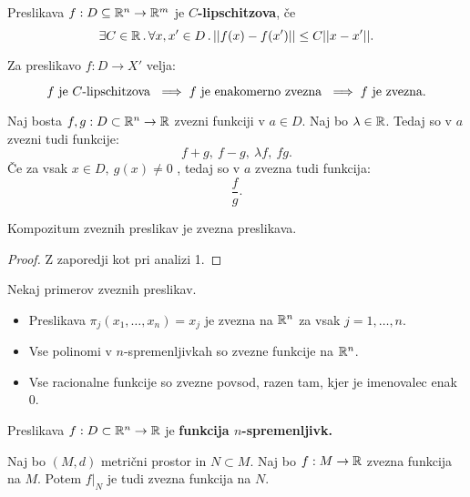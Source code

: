 \begin{definicija}
    Preslikava $f: D \subseteq \mathbb{R}^n \to \mathbb{R}^m$ je \textbf{$C$-lipschitzova}, če
    $$\exists C \in \mathbb{R} \,.\, \forall x, x' \in D \,.\, ||f(x) - f(x')|| \leq C ||x - x'||.$$
\end{definicija}

\begin{trditev}
    Za preslikavo $f: D \to X'$ velja:

    $$f \text{ je $C$-lipschitzova } \implies f \text{ je enakomerno zvezna } \implies f \text{ je zvezna}.$$
\end{trditev}

\begin{trditev}
    Naj bosta $f, g: D \subset \mathbb{R}^n \to \mathbb{R}$ zvezni funkciji v $a \in D$. Naj bo $\lambda \in \mathbb{R}$. Tedaj so v $a$ zvezni tudi funkcije:
    $$f+g, \ f-g, \ \lambda f, \ fg.$$
    Če za vsak $x \in D, \ g(x) \neq 0$ , tedaj so v $a$ zvezna tudi funkcija: 
    $$\frac{f}{g}.$$
\end{trditev}

\begin{trditev}
    Kompozitum zveznih preslikav je zvezna preslikava.
\end{trditev}

\begin{proof}
    Z zaporedji kot pri analizi 1.
\end{proof}

\begin{zgled}
    Nekaj primerov zveznih preslikav.
    \begin{itemize}
        \item Preslikava $\pi_j(x_1, \ldots, x_n) = x_j$ je zvezna na $\mathbb{R}^n$ za vsak $j = 1, \ldots, n$.
        \item Vse polinomi v $n$-spremenljivkah so zvezne funkcije na $\mathbb{R}^n$.
        \item Vse racionalne funkcije so zvezne povsod, razen tam, kjer je imenovalec enak $0$.
    \end{itemize}
\end{zgled}

\begin{definicija}
    Preslikava $f: D \subset \mathbb{R}^n \to \mathbb{R}$ je \textbf{funkcija $n$-spremenljivk.}
\end{definicija}

\begin{opomba}
    Naj bo $(M, d)$ metrični prostor in $N \subset M$. Naj bo $f: M \to \mathbb{R}$ zvezna funkcija na $M$. Potem $f|_N$ je tudi zvezna funkcija na $N$.
\end{opomba}


